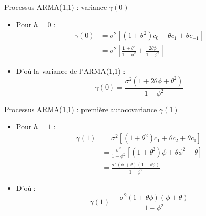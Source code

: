 \documentclass[11pt,aspectratio=169]{beamer}
\begin{document}
\begin{frame}{Processus ARMA(1,1) : variance $\gamma(0)$}

\begin{itemize}

\item Pour $h = 0$ :
  \begin{align*}
  \gamma(0) &= \sigma^2 \left[ (1+\theta^2)c_0 + \theta c_1 + \theta c_{-1} \right] \\
  &= \sigma^2 \left[ \frac{1+\theta^2}{1-\phi^2} + \frac{2\theta\phi}{1-\phi^2} \right]
  \end{align*}\newline

\item D'où la variance de l'ARMA(1,1) :
  \[
  \gamma(0) = \frac{\sigma^2(1 + 2\theta\phi + \theta^2)}{1 - \phi^2}
  \]

\end{itemize}

\end{frame}

\begin{frame}{Processus ARMA(1,1) : première autocovariance $\gamma(1)$}

\begin{itemize}

\item Pour $h = 1$ :
  \begin{align*}
  \gamma(1) &= \sigma^2 \left[ (1+\theta^2)c_1 + \theta c_2 + \theta c_0 \right] \\
  &= \frac{\sigma^2}{1-\phi^2} \left[ (1+\theta^2)\phi + \theta\phi^2 + \theta \right] \\
  &= \frac{\sigma^2(\phi + \theta)(1 + \theta\phi)}{1-\phi^2}
  \end{align*}\newline

\item D'où :
  \[
  \gamma(1) = \frac{\sigma^2(1 + \theta\phi)(\phi + \theta)}{1 - \phi^2}
  \]

\end{itemize}

\end{frame}
\end{document}
